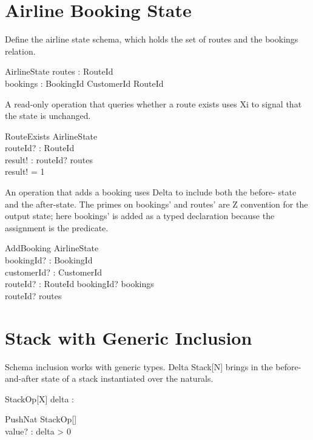 \documentclass[a4paper,10pt,fleqn]{article}
\begin{document}
\section*{Airline Booking State}

\noindent Define the airline state schema, which holds the set of routes and the bookings relation.

\bigskip

\begin{zed}
\end{zed}

\begin{schema}{AirlineState}
routes : \power RouteId \\
bookings : BookingId \pfun CustomerId \cross RouteId
\end{schema}

\noindent A read-only operation that queries whether a route exists uses Xi to signal that the state is unchanged.

\bigskip

\begin{schema}{RouteExists}
\Xi AirlineState \\
routeId? : RouteId \\
result! : \nat
\where
routeId? \in routes \\
result! = 1
\end{schema}

\noindent An operation that adds a booking uses Delta to include both the before- state and the after-state. The primes on bookings' and routes' are Z convention for the output state; here bookings' is added as a typed declaration because the assignment is the predicate.

\bigskip

\begin{schema}{AddBooking}
\Delta AirlineState \\
bookingId? : BookingId \\
customerId? : CustomerId \\
routeId? : RouteId
\where
bookingId? \notin \dom bookings \\
routeId? \in routes
\end{schema}

\section*{Stack with Generic Inclusion}

\noindent Schema inclusion works with generic types. Delta Stack[N] brings in the before-and-after state of a stack instantiated over the naturals.

\bigskip

\begin{schema}{StackOp}[X]
delta : \nat
\end{schema}

\begin{schema}{PushNat}
\Delta StackOp[\nat] \\
value? : \nat
\where
delta > 0
\end{schema}
\end{document}
